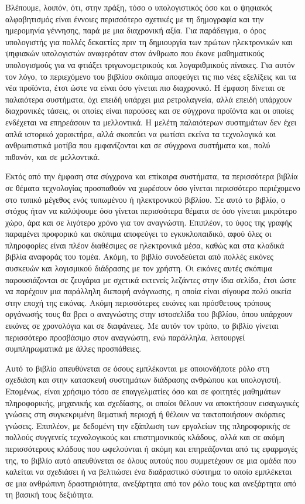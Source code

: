 \documentclass[
]{article}
\begin{document}
Βλέπουμε, λοιπόν, ότι, στην πράξη, τόσο ο υπολογιστικός όσο και ο
ψηφιακός αλφαβητισμός είναι έννοιες περισσότερο σχετικές με τη
δημογραφία και την ημερομηνία γέννησης, παρά με μια διαχρονική αξία. Για
παράδειγμα, ο όρος υπολογιστής για πολλές δεκαετίες πριν τη δημιουργία
των πρώτων ηλεκτρονικών και ψηφιακών υπολογιστών αναφερόταν στον άνθρωπο
που έκανε μαθηματικούς υπολογισμούς για να φτιάξει τριγωνομετρικούς και
λογαριθμικούς πίνακες. Για αυτόν τον λόγο, το περιεχόμενο του βιβλίου
σκόπιμα αποφεύγει τις πιο νέες εξελίξεις και τα νέα προϊόντα, έτσι ώστε
να είναι όσο γίνεται πιο διαχρονικό. Η έμφαση δίνεται σε παλαιότερα
συστήματα, όχι επειδή υπάρχει μια ρετρολαγνεία, αλλά επειδή υπάρχουν
διαχρονικές τάσεις, οι οποίες είναι παρούσες και σε σύγχρονα προϊόντα
και οι οποίες ενδέχεται να επηρεάσουν τα μελλοντικά. Η μελέτη
παλαιότερων συστημάτων δεν έχει απλά ιστορικό χαρακτήρα, αλλά σκοπεύει
να φωτίσει εκείνα τα τεχνολογικά και ανθρωπιστικά μοτίβα που
εμφανίζονται και σε σύγχρονα συστήματα και, πολύ πιθανόν, και σε
μελλοντικά.

Εκτός από την έμφαση στα σύγχρονα και επίκαιρα συστήματα, τα περισσότερα
βιβλία σε θέματα τεχνολογίας προσπαθούν να χωρέσουν όσο γίνεται
περισσότερο περιέχομενο στο τυπικό μέγεθος ενός τυπωμένου ή ηλεκτρονικού
βιβλίου. Σε αυτό το βιβλίο, ο στόχος ήταν να καλύψουμε όσο γίνεται
περισσότερα θέματα σε όσο γίνεται μικρότερο χώρο, άρα και σε λιγότερο
χρόνο για τον αναγνώστη. Επιπλέον, το ύφος της γραφής παραμένει
προφορικό και σκόπιμα αποφεύγει το εγκυκλοπαιδικό, αφού όλες οι
πληροφορίες είναι πλέον διαθέσιμες σε ηλεκτρονικά μέσα, καθώς και στα
κλαδικά βιβλία αναφοράς του τομέα. Ακόμη, το βιβλίο συνοδεύεται από
πολλές εικόνες συσκευών και λογισμικού διάδρασης με τον χρήστη. Οι
εικόνες αυτές σκόπιμα παρουσιάζονται σε ζευγάρια με σχετικά εκτενείς
λεζάντες στην ίδια σελίδα, έτσι ώστε να παρέχουν μια παράλληλη διεπαφή
ανάγνωσης, η οποία είναι σίγουρα πολύ οικεία στην εποχή της εικόνας.
Ακόμη περισσότερες εικόνες και πρόσθετους τρόπους οργάνωσής τους θα βρει
ο αναγνώστης στην ιστοσελίδα του βιβλίου, όπου υπάρχουν εικόνες σε
χρονολόγια και σε διαφάνειες. Με αυτόν τον τρόπο, το βιβλίο γίνεται
περισσότερο προσβάσιμο στον αναγνώστη, ενώ παράλληλα, λειτουργεί
συμπληρωματικά με άλλες προσπάθειες.

Αυτό το βιβλίο απευθύνεται σε όσους εμπλέκονται με οποιονδήποτε ρόλο στη
σχεδιάση και στην κατασκευή συστημάτων διάδρασης ανθρώπου και
υπολογιστή. Επομένως, είναι χρήσιμο τόσο σε επαγγελματίες όσο και σε
φοιτητές μαθημάτων πληροφορικής, μηχανικής και σχεδίασης, οι οποίοι
θέλουν να αποκτήσουν εισαγωγικές γνώσεις στη συγκεκριμένη θεματική
περιοχή ή θέλουν να τακτοποιήσουν σκόρπιες γνώσεις. Επιπλέον, με
δεδομένη την εξάπλωση των εργαλείων της πληροφορικής σε πολλούς
συγγενείς τεχνολογικούς και επιστημονικούς κλάδους, αλλά και σε ακόμη
περισσότερους κλάδους που ωφελούνται ή ακόμη και επηρεάζονται από τις
εφαρμογές της, το βιβλίο αυτό απευθύνεται σε όλους αυτούς που
συμμετέχουν σε μια ομάδα που καλείται να σχεδιάσει ή να βελτιώσει ένα
διαδραστικό σύστημα το οποίο εμπλέκεται σε μια ανθρώπινη δραστηριότητα,
ανεξάρτητα από τον ρόλο τους και ανεξάρτητα από τη βασική τους
δεξιότητα.
\end{document}
